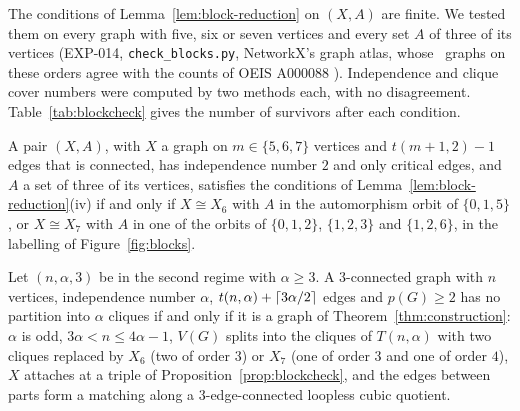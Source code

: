 The conditions of Lemma~\ref{lem:block-reduction} on $(X,A)$ are finite. We tested them on every graph with five, six
or seven vertices and every set $A$ of three of its vertices (EXP-014, \texttt{check\_blocks.py}, NetworkX's graph
atlas, whose \nblockatlas\ graphs on these orders agree with the counts of OEIS A000088 \cite{OEIS}). Independence
and clique cover numbers were computed by two methods each, with no disagreement. Table~\ref{tab:blockcheck} gives
the number of survivors after each condition.

\begin{table}[t]
\centering\small
\caption{The finite check behind Proposition~\ref{prop:blockcheck}: graphs on five to seven vertices and attaching
triples that survive each necessary condition of Lemma~\ref{lem:block-reduction}, and the isomorphism classes of the
marked blocks that survive all of them, with the observed triple each class equals.}
\label{tab:blockcheck}

\end{table}

\begin{proposition}\label{prop:blockcheck}
A pair $(X,A)$, with $X$ a graph on $m\in\{5,6,7\}$ vertices and $t(m+1,2)-1$ edges that is connected, has independence number $2$ and only critical edges, and $A$ a set of three of its vertices, satisfies the conditions of Lemma~\ref{lem:block-reduction}(iv) if and only if $X\cong X_6$
with $A$ in the automorphism orbit of $\{0,1,5\}$, or $X\cong X_7$ with $A$ in one of the orbits of $\{0,1,2\}$,
$\{1,2,3\}$ and $\{1,2,6\}$, in the labelling of Figure~\ref{fig:blocks}.
\end{proposition}

\begin{theorem}\label{thm:characterise}
Let $(n,\alpha,3)$ be in the second regime with $\alpha\ge3$. A $3$-connected graph with $n$ vertices, independence
number $\alpha$, $t(n,\alpha)+\left\lceil 3\alpha/2\right\rceil$ edges and $p(G)\ge2$ has no partition into $\alpha$ cliques if and only
if it is a graph of Theorem~\ref{thm:construction}: $\alpha$ is odd, $3\alpha<n\le4\alpha-1$, $V(G)$ splits into the
cliques of $T(n,\alpha)$ with two cliques replaced by $X_6$ (two of order $3$) or $X_7$ (one of order $3$ and one of
order $4$), $X$ attaches at a triple of Proposition~\ref{prop:blockcheck}, and the edges between parts form a matching
along a $3$-edge-connected loopless cubic quotient.
\end{theorem}

